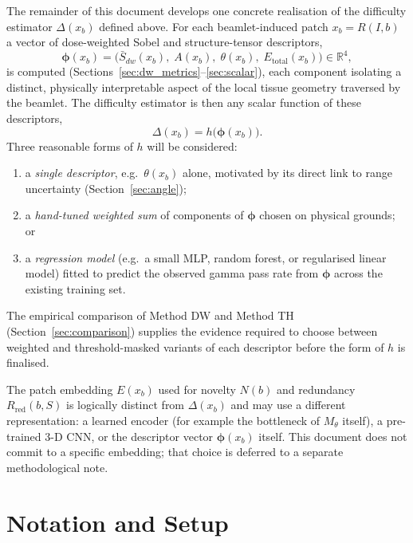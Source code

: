 \documentclass[11pt,a4paper]{article}
\begin{document}
The remainder of this document develops one concrete realisation of the
difficulty estimator $\Delta(x_b)$ defined above.
For each beamlet-induced patch $x_b = R(I,b)$ a vector of dose-weighted
Sobel and structure-tensor descriptors,
\[
    \boldsymbol{\phi}(x_b)
    = \bigl(\bar{S}_{dw}(x_b),\;
            A(x_b),\;
            \theta(x_b),\;
            E_{\text{total}}(x_b)\bigr) \in \mathbb{R}^4,
\]
is computed (Sections~\ref{sec:dw_metrics}--\ref{sec:scalar}), each component
isolating a distinct, physically interpretable aspect of the local tissue
geometry traversed by the beamlet.
The difficulty estimator is then any scalar function of these descriptors,
\[
    \Delta(x_b) = h\bigl(\boldsymbol{\phi}(x_b)\bigr).
\]
Three reasonable forms of $h$ will be considered:
\begin{enumerate}
    \item a \emph{single descriptor}, e.g.\ $\theta(x_b)$ alone, motivated
          by its direct link to range uncertainty
          (Section~\ref{sec:angle});
    \item a \emph{hand-tuned weighted sum} of components of
          $\boldsymbol{\phi}$ chosen on physical grounds; or
    \item a \emph{regression model} (e.g.\ a small MLP, random forest, or
          regularised linear model) fitted to predict the observed gamma
          pass rate from $\boldsymbol{\phi}$ across the existing training
          set.
\end{enumerate}
The empirical comparison of Method DW and Method TH
(Section~\ref{sec:comparison}) supplies the evidence required to choose
between weighted and threshold-masked variants of each descriptor before
the form of $h$ is finalised.

The patch embedding $E(x_b)$ used for novelty $N(b)$ and redundancy
$R_{\mathrm{red}}(b,S)$ is logically distinct from $\Delta(x_b)$ and may use a
different representation: a learned encoder (for example the bottleneck of
$M_\theta$ itself), a pre-trained 3-D CNN, or the descriptor vector
$\boldsymbol{\phi}(x_b)$ itself.
This document does not commit to a specific embedding; that choice is
deferred to a separate methodological note.

\section{Notation and Setup}
\label{sec:notation}
\end{document}
